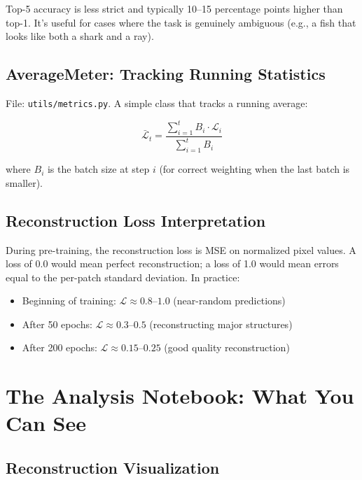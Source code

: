 \documentclass[12pt, a4paper]{report}
\begin{document}
Top-5 accuracy is less strict and typically 10–15 percentage points higher than top-1. It's useful for cases where the task is genuinely ambiguous (e.g., a fish that looks like both a shark and a ray).

\section{AverageMeter: Tracking Running Statistics}

File: \texttt{utils/metrics.py}. A simple class that tracks a running average:

\begin{equation}
\bar{\mathcal{L}}_t = \frac{\sum_{i=1}^{t} B_i \cdot \mathcal{L}_i}{\sum_{i=1}^{t} B_i}
\end{equation}

where $B_i$ is the batch size at step $i$ (for correct weighting when the last batch is smaller).

\section{Reconstruction Loss Interpretation}

During pre-training, the reconstruction loss is MSE on normalized pixel values. A loss of 0.0 would mean perfect reconstruction; a loss of 1.0 would mean errors equal to the per-patch standard deviation. In practice:

\begin{itemize}
    \item Beginning of training: $\mathcal{L} \approx 0.8$–$1.0$ (near-random predictions)
    \item After 50 epochs: $\mathcal{L} \approx 0.3$–$0.5$ (reconstructing major structures)
    \item After 200 epochs: $\mathcal{L} \approx 0.15$–$0.25$ (good quality reconstruction)
\end{itemize}

\chapter{The Analysis Notebook: What You Can See}

\section{Reconstruction Visualization}
\end{document}
